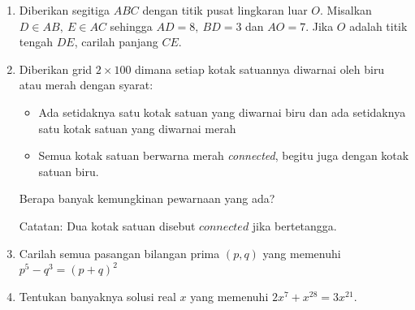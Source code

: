 \documentclass[12pt]{scrartcl}
\begin{document}
\begin{enumerate}[resume]
		\item Diberikan segitiga $ABC$ dengan titik pusat lingkaran luar $O$. Misalkan $D\in{AB},\ E\in{AC}$ sehingga $AD=8,\ BD=3$ dan $AO=7$. Jika $O$ adalah titik tengah $DE$, carilah panjang $CE$. 
		
		\item Diberikan grid $2 \times 100$ dimana setiap kotak satuannya diwarnai oleh biru atau merah dengan syarat: 
		\begin{itemize}
			\item Ada setidaknya satu kotak satuan yang diwarnai biru dan ada setidaknya satu kotak satuan yang diwarnai merah
			\item Semua kotak satuan berwarna merah \textit{connected}, begitu juga dengan kotak satuan biru.
		\end{itemize}
		Berapa banyak kemungkinan pewarnaan yang ada?
		
		Catatan: Dua kotak satuan disebut $\textit{connected}$ jika bertetangga.
		
		\item Carilah semua pasangan bilangan prima $(p,q)$ yang memenuhi $p^5-q^3=(p+q)^2$
		
		\item Tentukan banyaknya solusi real $x$ yang memenuhi $2x^7+x^{28}=3x^{21}.$
\end{enumerate}
\end{document}

